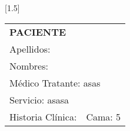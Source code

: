 \documentclass[10pt,a4paper]{article}
\begin{document}
 
\begin{minipage}{10cm}
\end{minipage}
\hfill
\begin{minipage}{10cm}
\begin{flushleft}
\scalebox{1.4}[1.5]{
\begin{tabular}{|p{3cm}p{2.3cm}|}
\hline 
\multicolumn{2}{|l|}{\scriptsize{\textbf{PACIENTE}}}\\
\multicolumn{2}{|p{5.3cm}|}{\scriptsize{Apellidos:  }}\\ 
\multicolumn{2}{|p{5.3cm}|}{\scriptsize{Nombres:  }}\\ 
\multicolumn{2}{|p{5.3cm}|}{\scriptsize{M\'edico Tratante: asas}}\\ 
\hline 
\multicolumn{2}{|p{5.3cm}|}{\scriptsize{Servicio: asasa}}\\
\hline 
\scriptsize{Historia Cl\'inica: }&\scriptsize{Cama: 5} \\ 
\hline 
\end{tabular}}
\end{flushleft}
\end{minipage}
\end{document}

